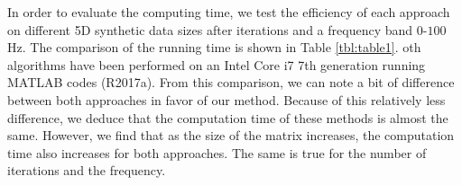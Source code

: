 In order to evaluate the computing time, we test the efficiency of each approach on different 5D synthetic data sizes after  iterations and a frequency band  $0$-$100$ Hz. The comparison of the running time is shown in Table \ref{tbl:table1}. oth algorithms have been performed on an Intel Core i7 7th generation running MATLAB codes (R2017a). From this comparison, we can note a  bit of difference between both approaches in favor of our method. Because of this relatively less difference, we deduce that the computation time of these methods is almost the same. However, we find that as the size of the matrix increases, the computation time also increases for both approaches. The same is true for the number of iterations and the frequency.

